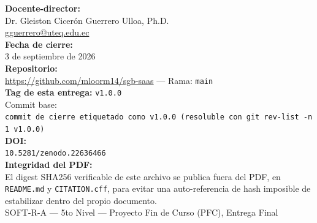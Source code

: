 \begin{titlepage}
{\normalsize\bfseries Docente-director:}\\
Dr. Gleiston Cicerón Guerrero Ulloa, Ph.D.\\
\small \href{mailto:gguerrero@uteq.edu.ec}{gguerrero@uteq.edu.ec}\\[1cm]

{\normalsize\bfseries Fecha de cierre:}\\
3 de septiembre de 2026\\[1cm]

{\normalsize\bfseries Repositorio:}\\
\url{https://github.com/mloorm14/sgb-saas} \quad --- \quad Rama: \texttt{main}\\[0.5cm]

{\normalsize\bfseries Tag de esta entrega:} \texttt{v1.0.0}\\[0.2cm]
{\small Commit base:}\\
{\small\texttt{commit de cierre etiquetado como v1.0.0 (resoluble con \texttt{git rev-list -n 1 v1.0.0})}}\\[0.5cm]

{\normalsize\bfseries DOI:}\\
{\small \texttt{10.5281/zenodo.22636466}}\\[0.5cm]

{\normalsize\bfseries Integridad del PDF:}\\
{\small El digest SHA256 verificable de este archivo se publica fuera del
PDF, en \texttt{README.md} y \texttt{CITATION.cff}, para evitar una
auto-referencia de hash imposible de estabilizar dentro del propio
documento.}\\[0.5cm]

\vfill
{\small SOFT-R-A --- 5to Nivel --- Proyecto Fin de Curso (PFC), Entrega Final}
\end{titlepage}
